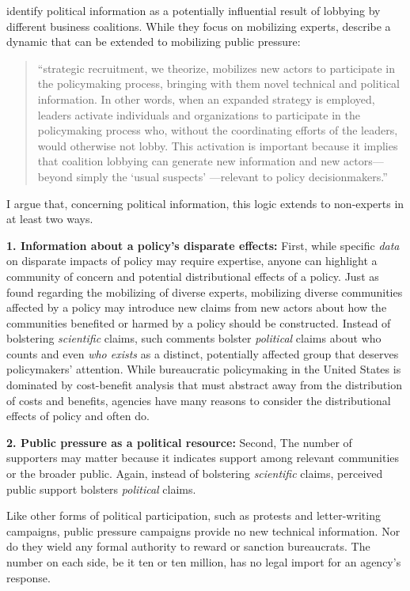 \documentclass[
      12pt,
        ]{article}
\begin{document}
\citet{Nelson2012}
identify political information as a potentially influential result of
lobbying by different business coalitions. While they focus on
mobilizing experts, \citet{Nelson2012} describe a dynamic that can be extended
to mobilizing public pressure:

\begin{quote}
``strategic recruitment, we theorize, mobilizes new actors to
participate in the policymaking process, bringing with them novel
technical and political information. In other words, when an expanded
strategy is employed, leaders activate individuals and organizations
to participate in the policymaking process who, without the
coordinating efforts of the leaders, would otherwise not lobby. This
activation is important because it implies that coalition lobbying can
generate new information and new actors---beyond simply the `usual
suspects' ---relevant to policy decisionmakers.''
\end{quote}

I argue that, concerning political information, this logic extends to
non-experts in at least two ways.

\textbf{1. Information about a policy's disparate effects:}
First, while specific \emph{data} on disparate impacts of policy may require expertise, anyone can highlight a community of concern and potential distributional effects of a policy. Just as \citet{Nelson2012} found regarding the mobilizing of diverse experts, mobilizing diverse communities affected by a policy may introduce new claims from new actors about how the communities benefited or harmed by a policy should be constructed. Instead of bolstering
\emph{scientific} claims, such comments bolster \emph{political}
claims about who counts and even \emph{who exists} as a distinct, potentially affected group that deserves policymakers' attention. While bureaucratic policymaking in the United States is dominated by cost-benefit analysis that must abstract away from the distribution of costs and benefits, agencies have many reasons to consider the distributional effects of policy and often do.

\textbf{2. Public pressure as a political resource: }
Second, The number of supporters may
matter because it indicates support among relevant communities or the broader public. Again, instead of bolstering
\emph{scientific} claims, perceived public support bolsters \emph{political}
claims.

Like other forms of political participation, such as protests and letter-writing campaigns,
public pressure campaigns provide no new technical information.
Nor do they wield any formal authority to reward or sanction bureaucrats.
The number on each side, be it ten or ten million, has no legal import for an agency's response.
\end{document}
